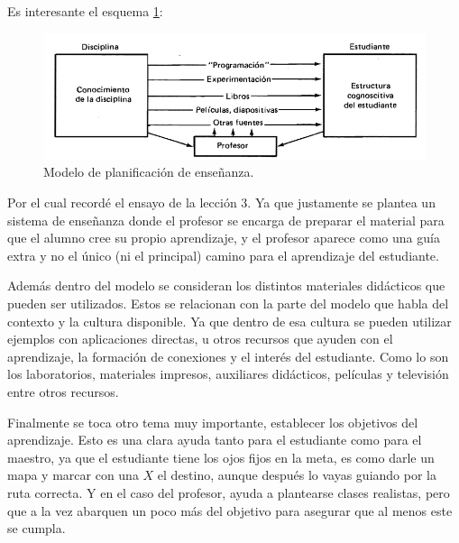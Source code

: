 Es interesante el esquema \ref{fig:esq}:

\begin{figure}[H]
    \centering
    \includegraphics[width = 0.6\linewidth]{Esquema.png}
    \caption{Modelo de planificación de enseñanza.}
    \label{fig:esq}
\end{figure}

Por el cual recordé el ensayo de la lección 3. Ya que justamente se plantea un sistema de enseñanza donde el profesor se encarga de preparar el material para que el alumno cree su propio aprendizaje, y el profesor aparece como una guía extra y no el único (ni el principal) camino para el aprendizaje del estudiante.

Además dentro del modelo se consideran los distintos materiales didácticos que pueden ser utilizados. Estos se relacionan con la parte del modelo que habla del contexto y la cultura disponible. Ya que dentro de esa cultura se pueden utilizar ejemplos con aplicaciones directas, u otros recursos que ayuden con el aprendizaje, la formación de conexiones y el interés del estudiante. Como lo son los laboratorios, materiales impresos, auxiliares didácticos, películas y televisión entre otros recursos.

Finalmente se toca otro tema muy importante, establecer los objetivos del aprendizaje. Esto es una clara ayuda tanto para el estudiante como para el maestro, ya que el estudiante tiene los ojos fijos en la meta, es como darle un mapa y marcar con una $X$ el destino, aunque después lo vayas guiando por la ruta correcta. Y en el caso del profesor, ayuda a plantearse clases realistas, pero que a la vez abarquen un poco más del objetivo para asegurar que al menos este se cumpla.